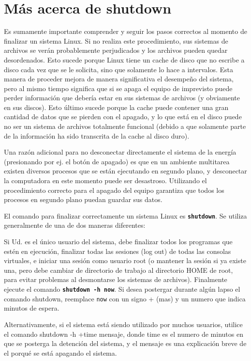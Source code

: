 \documentclass[12pt]{article}
\begin{document}
\section{ Más acerca de shutdown}

 Es sumamente importante comprender y seguir los pasos correctos al
momento de finalizar un sistema Linux. Si no realiza este procedimiento, sus
sistemas de archivos se verán probablemente perjudicados y los archivos pueden
quedar desordenados. Esto sucede porque Linux tiene un cache de disco que no
escribe a disco cada vez que se le solicita, sino que solamente lo hace a
intervalos. Esta manera de proceder mejora de manera significativa el desempeño
del sistema, pero al mismo tiempo significa que si se apaga el equipo de
imprevisto puede perder información que debería estar en sus sistemas de
archivos (y obviamente en sus discos). Esto último sucede porque la cache puede
contener una gran cantidad de datos que se pierden con el apagado, y lo que está
en el disco puede no ser un sistema de archivos totalmente funcional (debido a
que solamente parte de la información ha sido transcrita de la cache al disco
duro).  

 Una razón adicional para no desconectar directamente el sistema de la
energía (presionando por ej. el botón de apagado) es que en un ambiente
multitarea existen diversos procesos que se están ejecutando en segundo plano, y
desconectar la computadora en este momento puede ser desastroso. Utilizando el
procedimiento correcto para el apagado del equipo garantiza que todos los
procesos en segundo plano puedan guardar sus datos.  

 El comando para finalizar correctamente un sistema Linux es
\texttt{\textbf{shutdown}}. Se utiliza generalmente de una de dos maneras
diferentes: 

 Si Ud. es el único usuario del sistema, debe finalizar todos los
programas que estén en ejecución, finalizar todas las sesiones (log out) de
todas las consolas virtuales, e iniciar una sesión como usuario root (o mantener
la sesión si ya existe una, pero debe cambiar de directorio de trabajo al
directorio HOME de root, para evitar problemas al desmontarse los sistemas de
archivos). Finalmente ejecute el comando \texttt{\textbf{shutdown -h now}}. Si
desea postergar durante algún lapso el comando shutdown, reemplace
\texttt{now} con un signo + (mas) y un numero que indica minutos de
espera.  

 Alternativamente, si el sistema está siendo utilizado por muchos
usuarios, utilice el comando shutdown -h +time mensaje, donde time es el numero
de minutos en que se posterga la detención del sistema, y el mensaje es una
explicación breve de el porqué se está apagando el sistema.
\end{document}
